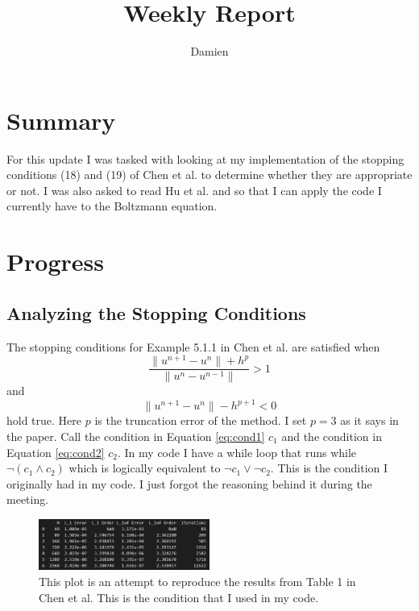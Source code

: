 \documentclass{article}
\title{Weekly Report}
\author{Damien}
\begin{document}
\maketitle
\section{Summary}
For this update I was tasked with looking at my implementation of the stopping conditions (18) and (19) of Chen et al. \cite{CHEN2013452} to determine whether they are appropriate or not. I was also asked to read Hu et al. \cite{hu2021adaptive} and \cite{su2019implicit} so that I can apply the code I currently have to the Boltzmann equation.
\section{Progress}
\subsection{Analyzing the Stopping Conditions}
The stopping conditions for Example 5.1.1 in Chen et al. \cite{CHEN2013452} are satisfied when
\begin{equation}\label{eq:cond1}
    \frac{\|u^{n+1} - u^n\| + h^p}{\|u^n - u^{n-1}\|} > 1
\end{equation}
and
\begin{equation}\label{eq:cond2}
    \|u^{n+1} - u^n\| - h^{p+1} < 0
\end{equation}
hold true. Here $p$ is the truncation error of the method. I set $p=3$ as it says in the paper. Call the condition in Equation \ref{eq:cond1} $c_1$ and the condition in Equation \ref{eq:cond2} $c_2$. In my code I have a while loop that runs while $\neg(c_1 \land c_2)$ which is logically equivalent to $\neg c_1 \lor \neg c_2$. This is the condition I originally had in my code. I just forgot the reasoning behind it during the meeting.
\begin{figure}[h]
    \centering
    \includegraphics[width=0.5\textwidth]{imgs/5_1_1_table.png}
    \caption{This plot is an attempt to reproduce the results from Table 1 in Chen et al. This is the condition that I used in my code.}
\end{figure}
\end{document}
